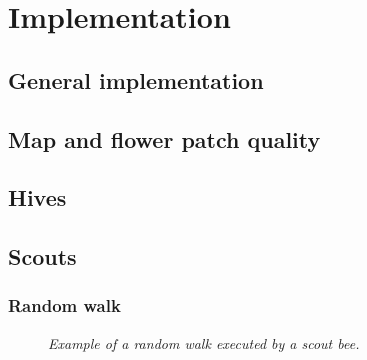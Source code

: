 \section{Implementation}
\subsection{General implementation}
\subsection{Map and flower patch quality}
\subsection{Hives}
\subsection{Scouts}
	\subsubsection{Random walk}
		\begin{figure}\label{fig:randomWalk}
			\centering
			\caption{\textit{Example of a random walk executed by a scout bee.}}
		\end{figure}

